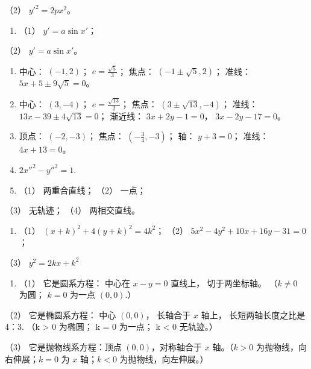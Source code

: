 （2） \(y'^{2}=2px^{2}\)。

\begin{enumerate}
\def\labelenumi{\arabic{enumi}.}
\setcounter{enumi}{1}
\tightlist
\item
  （1） \(y' = a \sin x'\)；
\end{enumerate}

（2） \(y' = a \sin x'\)。

\begin{enumerate}
\def\labelenumi{\arabic{enumi}.}
\setcounter{enumi}{2}
\item
  中心： \((-1, 2)\)； \(e = \frac{\sqrt{5}}{3}\)； 焦点：
  \((-1 \pm \sqrt{5}, 2)\)； 准线： \(5x + 5 \pm 9\sqrt{5} = 0\)。
\item
  中心： \((3, -4)\)； \(e = \frac{\sqrt{13}}{2}\)； 焦点：
  \((3 \pm \sqrt{13}, -4)\)； 准线： \(13x - 39 \pm 4\sqrt{13} = 0\)；
  渐近线： \(3x + 2y - 1 = 0\)， \(3x - 2y - 17 = 0\)。
\item
  顶点： \((-2,-3)\)； 焦点： \(\left(-\frac{3}{4},-3\right)\)； 轴：
  \(y+3=0\)； 准线： \(4x+13=0\)。
\item
  \(2x''^{2} - y''^{2} = 1.\)
\item
  （1） 两重合直线； （2） 一点；
\end{enumerate}

（3） 无轨迹； （4） 两相交直线。

\begin{enumerate}
\def\labelenumi{\arabic{enumi}.}
\setcounter{enumi}{7}
\tightlist
\item
  （1） \((x + k)^2 + 4(y + k)^2 = 4k^2\)； （2）
  \(5x^2 - 4y^2 + 10x + 16y - 31 = 0\)；
\end{enumerate}

（3） \(y^{2}=2kx+k^{2}\)

\begin{enumerate}
\def\labelenumi{\arabic{enumi}.}
\setcounter{enumi}{9}
\tightlist
\item
  （1） 它是圆系方程： 中心在 \(x - y = 0\) 直线上， 切于两坐标轴。
  （\(k \neq 0\) 为圆； \(k = 0\) 为一点 \((0, 0)\).）
\end{enumerate}

（2） 它是椭圆系方程： 中心 \((0, 0)\)， 长轴合于 \(x\) 轴上，
长短两轴长度之比是 4：3. （k \textgreater{} 0 为椭圆； k = 0 为一点； k
\textless{} 0 无轨迹。）

（3） 它是抛物线系方程：顶点 \((0,0)\)，对称轴合于 \(x\) 轴。（\(k > 0\)
为抛物线，向右伸展；\(k = 0\) 为 \(x\) 轴；\(k < 0\)
为抛物线，向左伸展。）

